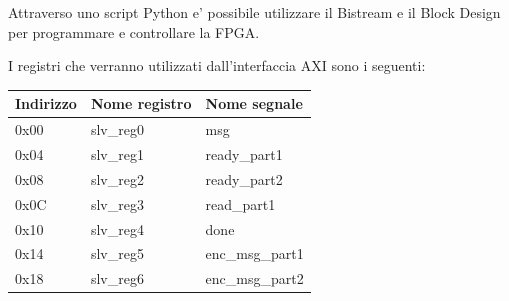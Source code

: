 \documentclass[a4paper]{article}
\begin{document}
Attraverso uno script Python e' possibile utilizzare il Bistream e il Block Design per programmare e controllare la FPGA.

I registri che verranno utilizzati dall'interfaccia AXI sono i seguenti:
\begin{table}[!ht]
    \centering
    \begin{tabular}{|l|l|l|}
    \hline
        Indirizzo & Nome registro & Nome segnale \\ \hline
        0x00 & slv\_reg0 & msg \\ \hline
        0x04 & slv\_reg1 & ready\_part1 \\ \hline
        0x08 & slv\_reg2 & ready\_part2 \\ \hline
        0x0C & slv\_reg3 & read\_part1 \\ \hline
        0x10 & slv\_reg4 & done \\ \hline
        0x14 & slv\_reg5 & enc\_msg\_part1 \\ \hline
        0x18 & slv\_reg6 & enc\_msg\_part2 \\ \hline
    \end{tabular}
\end{table}
\end{document}
